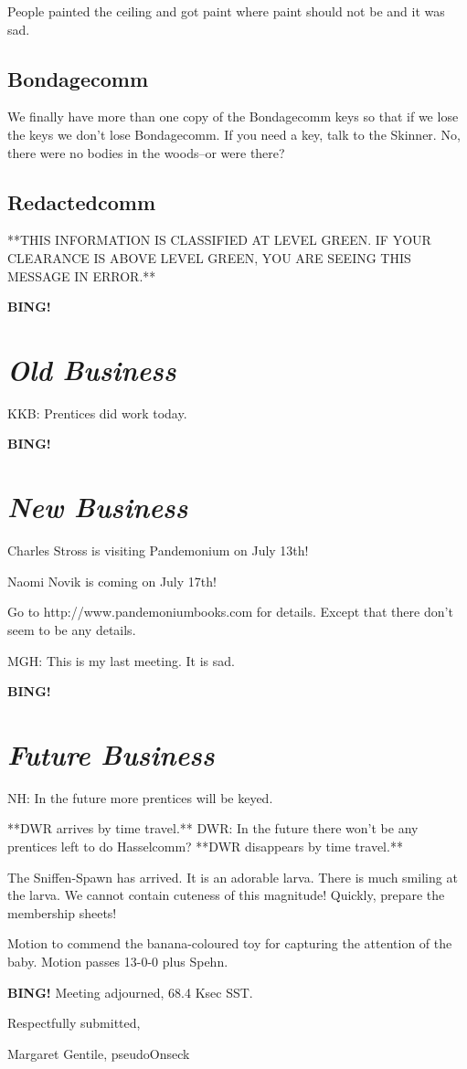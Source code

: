 \documentclass[10pt]{article}
\newcommand{\bing}{{\bf BING!} }
\newcommand{\goto}[1]{\bing \vskip 12pt \section*{{\em{#1}}}}
\newcommand{\ps}{ plus Spehn\xspace}
\newcommand{\onseck}{Margaret Gentile, pseudoOnseck}
\begin{document}
People painted the ceiling and got paint where paint
should not be and it was sad.

\subsection*{Bondagecomm}

We finally have more than one copy of the Bondagecomm keys so that if
we lose the keys we don't lose Bondagecomm.  If you need a key, talk
to the Skinner.  No, there were no bodies in the woods--or were there?

\subsection*{Redactedcomm}

**THIS INFORMATION IS CLASSIFIED AT LEVEL GREEN.  IF YOUR CLEARANCE
IS ABOVE LEVEL GREEN, YOU ARE SEEING THIS MESSAGE IN ERROR.**	


\goto{Old Business}

KKB: Prentices did work today.


\goto{New Business}

Charles Stross is visiting Pandemonium on July 13th!

Naomi Novik is coming on July 17th!

Go to http://www.pandemoniumbooks.com for details.  Except that there
don't seem to be any details.

MGH: This is my last meeting.  It is sad.


\goto{Future Business}

NH: In the future more prentices will be keyed.

**DWR arrives by time travel.**
DWR: In the future there won't be any prentices left to do 
Hasselcomm?
**DWR disappears by time travel.**

The Sniffen-Spawn has arrived.  It is an adorable larva.  There is much
smiling at the larva.  We cannot contain cuteness of this magnitude!
Quickly, prepare the membership sheets!

Motion to commend the banana-coloured toy for capturing the 
attention of the baby.  Motion passes 13-0-0\ps.


\bing
\noindent
Meeting adjourned, 68.4 Ksec SST.

\vspace{18pt}

\centerline{Respectfully submitted,}
\centerline{\onseck}
\end{document}
